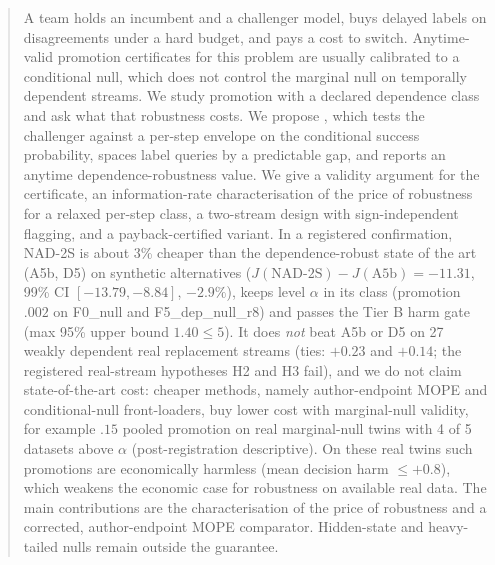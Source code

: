 \begin{abstract}
A team holds an incumbent and a challenger model, buys delayed labels on disagreements under a hard
budget, and pays a cost to switch. Anytime-valid promotion certificates for this problem are usually
calibrated to a conditional null, which does not control the marginal null on temporally dependent
streams. We study promotion with a declared dependence class and ask what that robustness costs.
We propose \NAD, which tests the challenger against a per-step envelope on the conditional success
probability, spaces label queries by a predictable gap, and reports an anytime
dependence-robustness value. We give a validity argument for the certificate, an
information-rate characterisation of the price of robustness for a relaxed per-step class, a
two-stream design with sign-independent flagging, and a payback-certified variant.
In a registered confirmation, NAD-2S is about 3\% cheaper than the dependence-robust state of the art
(A5b, D5) on synthetic alternatives ($J(\text{NAD-2S})-J(\text{A5b})=-11.31$, 99\% CI $[-13.79,-8.84]$,
$-2.9\%$), keeps level $\alpha$ in its class (promotion $.002$ on F0\_null and F5\_dep\_null\_r8) and
passes the Tier B harm gate (max 95\% upper bound $1.40\le5$). It does \emph{not} beat A5b or D5 on 27
weakly dependent real replacement streams (ties: $+0.23$ and $+0.14$; the registered
real-stream hypotheses H2 and H3 fail), and we do not claim state-of-the-art cost: cheaper methods, namely
author-endpoint MOPE and conditional-null front-loaders, buy lower cost with marginal-null validity,
for example $.15$ pooled promotion on real marginal-null twins with 4 of 5 datasets above $\alpha$
(post-registration descriptive). On these real twins such promotions are economically harmless (mean
decision harm $\le+0.8$), which weakens the economic case for robustness on available real data.
The main contributions are the characterisation of the price of robustness and a corrected,
author-endpoint MOPE comparator. Hidden-state and heavy-tailed nulls remain outside the guarantee.
\end{abstract}
